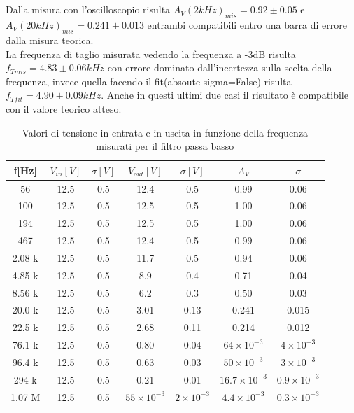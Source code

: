 \documentclass[10pt,a4paper]{article}
\begin{document}
\subsection{}
Dalla misura con l'oscilloscopio risulta $A_V(2kHz)_{mis} = 0.92\pm0.05$ e $A_V(20kHz)_{mis} = 0.241\pm0.013$ entrambi compatibili entro una barra di errore dalla misura teorica.\\La frequenza di taglio misurata vedendo la frequenza a -3dB risulta $f_{Tmis}=4.83\pm0.06kHz$ con errore dominato dall'incertezza sulla scelta della frequenza, invece quella facendo il fit(absoute-sigma=False) risulta $f_{Tfit}=4.90\pm0.09kHz$. Anche in questi ultimi due casi il risultato è compatibile con il valore teorico atteso.
\begin{table}[h]
	\centering
	\begin{tabular}{ccccccc}
		\hline
f[Hz]&$V_{in}[V]$&$\sigma[V]$&$V_{out}[V]$&$\sigma[V]$&$A_V$&$\sigma$\\
		\hline
		\hline
56& 12.5& 0.5& 12.4& 0.5& 0.99& 0.06\\
100& 12.5& 0.5& 12.5& 0.5& 1.00& 0.06\\
194& 12.5& 0.5& 12.5& 0.5& 1.00& 0.06\\
467& 12.5& 0.5& 12.4& 0.5& 0.99& 0.06\\
2.08 k& 12.5& 0.5& 11.7& 0.5& 0.94& 0.06\\
4.85 k& 12.5& 0.5& 8.9& 0.4& 0.71& 0.04\\
8.56 k& 12.5& 0.5& 6.2& 0.3& 0.50& 0.03\\
20.0 k& 12.5& 0.5& 3.01& 0.13& 0.241& 0.015\\
22.5 k& 12.5& 0.5& 2.68& 0.11& 0.214& 0.012\\
76.1 k& 12.5& 0.5& 0.80& 0.04& $64\times 10^{-3}$& $4\times 10^{-3}$\\
96.4 k& 12.5& 0.5& 0.63& 0.03& $50\times 10^{-3}$& $3\times 10^{-3}$\\
294 k& 12.5& 0.5& 0.21& 0.01& $16.7\times 10^{-3}$& $0.9\times 10^{-3}$\\
1.07 M& 12.5& 0.5& $55\times 10^{-3}$ & $2\times 10^{-3}$& $4.4\times 10^{-3}$& $0.3\times 10^{-3}$\\
	\end{tabular}
	\caption{Valori di tensione in entrata e in uscita in funzione della frequenza misurati per il filtro passa basso}
\end{table}
\end{document}
